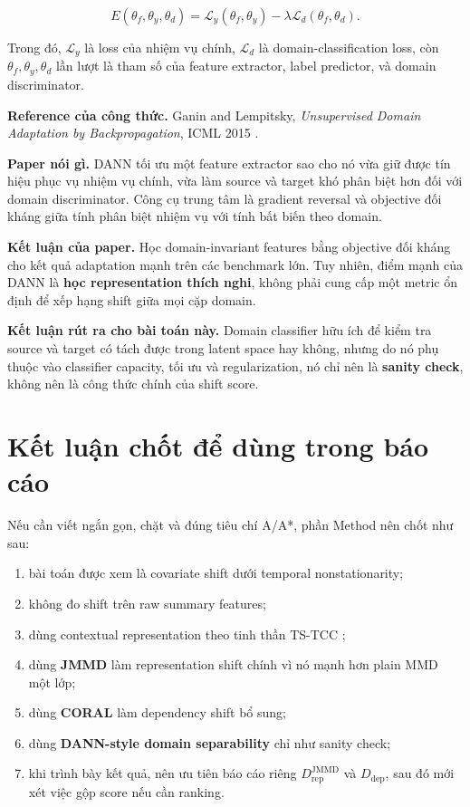 \documentclass[a4paper]{article}
\begin{document}
\[
E(\theta_f,\theta_y,\theta_d)
= \mathcal{L}_y(\theta_f,\theta_y)
- \lambda \mathcal{L}_d(\theta_f,\theta_d).
\]

Trong đó, \(\mathcal{L}_y\) là loss của nhiệm vụ chính, \(\mathcal{L}_d\) là domain-classification loss, còn \(\theta_f, \theta_y, \theta_d\) lần lượt là tham số của feature extractor, label predictor, và domain discriminator.

\textbf{Reference của công thức.} Ganin and Lempitsky, \emph{Unsupervised Domain Adaptation by Backpropagation}, ICML 2015 \cite{dann}.

\textbf{Paper nói gì.} DANN tối ưu một feature extractor sao cho nó vừa giữ được tín hiệu phục vụ nhiệm vụ chính, vừa làm source và target khó phân biệt hơn đối với domain discriminator. Công cụ trung tâm là gradient reversal và objective đối kháng giữa tính phân biệt nhiệm vụ với tính bất biến theo domain.

\textbf{Kết luận của paper.} Học domain-invariant features bằng objective đối kháng cho kết quả adaptation mạnh trên các benchmark lớn. Tuy nhiên, điểm mạnh của DANN là \textbf{học representation thích nghi}, không phải cung cấp một metric ổn định để xếp hạng shift giữa mọi cặp domain.

\textbf{Kết luận rút ra cho bài toán này.} Domain classifier hữu ích để kiểm tra source và target có tách được trong latent space hay không, nhưng do nó phụ thuộc vào classifier capacity, tối ưu và regularization, nó chỉ nên là \textbf{sanity check}, không nên là công thức chính của shift score.

\section{Kết luận chốt để dùng trong báo cáo}

Nếu cần viết ngắn gọn, chặt và đúng tiêu chí A/A*, phần Method nên chốt như sau:
\begin{enumerate}[label=\arabic*.]
    \item bài toán được xem là covariate shift dưới temporal nonstationarity;
    \item không đo shift trên raw summary features;
    \item dùng contextual representation theo tinh thần TS-TCC \cite{tstcc};
    \item dùng \textbf{JMMD} \cite{jan} làm representation shift chính vì nó mạnh hơn plain MMD một lớp;
    \item dùng \textbf{CORAL} \cite{coral} làm dependency shift bổ sung;
    \item dùng \textbf{DANN-style domain separability} \cite{dann} chỉ như sanity check;
    \item khi trình bày kết quả, nên ưu tiên báo cáo riêng \(D_{\mathrm{rep}}^{\mathrm{JMMD}}\) và \(D_{\mathrm{dep}}\), sau đó mới xét việc gộp score nếu cần ranking.
\end{enumerate}
\end{document}
